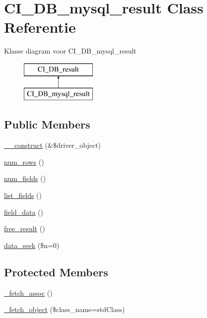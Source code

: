 \hypertarget{class_c_i___d_b__mysql__result}{}\section{C\+I\+\_\+\+D\+B\+\_\+mysql\+\_\+result Class Referentie}
\label{class_c_i___d_b__mysql__result}
Klasse diagram voor C\+I\+\_\+\+D\+B\+\_\+mysql\+\_\+result\begin{figure}[H]
\begin{center}
\leavevmode
\includegraphics[height=2.000000cm]{class_c_i___d_b__mysql__result}
\end{center}
\end{figure}
\subsection*{Public Members}
\begin{DoxyCompactItemize}
\item 
\mbox{\hyperlink{class_c_i___d_b__mysql__result_a8e093c8b6e5733bc3f306385ee426ab7}{\+\_\+\+\_\+construct}} (\&\$driver\+\_\+object)
\item 
\mbox{\hyperlink{class_c_i___d_b__mysql__result_a218657c303ee499b97710ab0cd2f5d6e}{num\+\_\+rows}} ()
\item 
\mbox{\hyperlink{class_c_i___d_b__mysql__result_af831bf363e4d7d661a717a4932af449d}{num\+\_\+fields}} ()
\item 
\mbox{\hyperlink{class_c_i___d_b__mysql__result_a50b54eb4ea7cfd039740f532988ea776}{list\+\_\+fields}} ()
\item 
\mbox{\hyperlink{class_c_i___d_b__mysql__result_a84bffd65e53902ade1591716749a33e3}{field\+\_\+data}} ()
\item 
\mbox{\hyperlink{class_c_i___d_b__mysql__result_aad2d98d6beb3d6095405356c6107b473}{free\+\_\+result}} ()
\item 
\mbox{\hyperlink{class_c_i___d_b__mysql__result_a8255ae91816e4206e29eb7581c5af0f1}{data\+\_\+seek}} (\$n=0)
\end{DoxyCompactItemize}
\subsection*{Protected Members}
\begin{DoxyCompactItemize}
\item 
\mbox{\hyperlink{class_c_i___d_b__mysql__result_a43a9a92817f1334a1c10752ec44275a0}{\+\_\+fetch\+\_\+assoc}} ()
\item 
\mbox{\hyperlink{class_c_i___d_b__mysql__result_a60806be6a9c2488820813c2a7f4fef71}{\+\_\+fetch\+\_\+object}} (\$class\+\_\+name=\textquotesingle{}std\+Class\textquotesingle{})
\end{DoxyCompactItemize}
